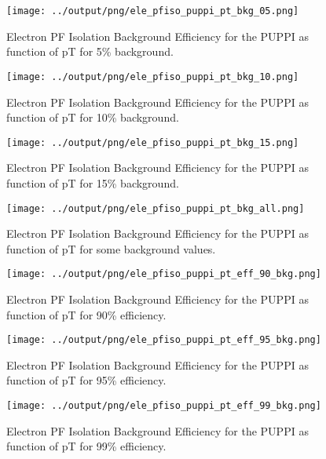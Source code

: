 \documentclass[11pt]{book}
\begin{document}
\begin{figure}[htb]
\centering
\texttt{[image: ../output/png/ele\_pfiso\_puppi\_pt\_bkg\_05.png]}
\caption{Electron PF Isolation Background Efficiency for the PUPPI as function of pT for 5\% background.}
\label{fig:ele_pfiso_pt_bkg_puppi_bkg_05}
\end{figure}

\begin{figure}[htb]
\centering
\texttt{[image: ../output/png/ele\_pfiso\_puppi\_pt\_bkg\_10.png]}
\caption{Electron PF Isolation Background Efficiency for the PUPPI as function of pT for 10\% background.}
\label{fig:ele_pfiso_pt_bkg_puppi_bkg_10}
\end{figure}

\begin{figure}[htb]
\centering
\texttt{[image: ../output/png/ele\_pfiso\_puppi\_pt\_bkg\_15.png]}
\caption{Electron PF Isolation Background Efficiency for the PUPPI as function of pT for 15\% background.}
\label{fig:ele_pfiso_pt_bkg_puppi_bkg_15}
\end{figure}

\begin{figure}[htb]
\centering
\texttt{[image: ../output/png/ele\_pfiso\_puppi\_pt\_bkg\_all.png]}
\caption{Electron PF Isolation Background Efficiency for the PUPPI as function of pT for some background values.}
\label{fig:ele_pfiso_pt_bkg_puppi_bkg_all}
\end{figure}

\begin{figure}[htb]
\centering
\texttt{[image: ../output/png/ele\_pfiso\_puppi\_pt\_eff\_90\_bkg.png]}
\caption{Electron PF Isolation Background Efficiency for the PUPPI as function of pT for 90\% efficiency.}
\label{fig:ele_pfiso_pt_eff_puppi_eff_90_bkg}
\end{figure}

\begin{figure}[htb]
\centering
\texttt{[image: ../output/png/ele\_pfiso\_puppi\_pt\_eff\_95\_bkg.png]}
\caption{Electron PF Isolation Background Efficiency for the PUPPI as function of pT for 95\% efficiency.}
\label{fig:ele_pfiso_pt_eff_puppi_eff_95_bkg}
\end{figure}

\begin{figure}[htb]
\centering
\texttt{[image: ../output/png/ele\_pfiso\_puppi\_pt\_eff\_99\_bkg.png]}
\caption{Electron PF Isolation Background Efficiency for the PUPPI as function of pT for 99\% efficiency.}
\label{fig:ele_pfiso_pt_eff_puppi_eff_99_bkg}
\end{figure}
\end{document}
